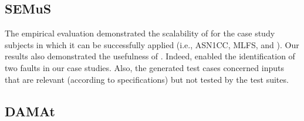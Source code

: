 \subsection{SEMuS}

%

The empirical evaluation demonstrated the scalability of \SEMUS for the case study subjects in which it can be successfully applied (i.e., ASN1CC, MLFS, and \UTIL). 
Our results also demonstrated the usefulness of \SEMUS. Indeed, \SEMUS enabled the identification of two faults in our case studies. Also, the generated test cases concerned inputs that are relevant (according to specifications) but not tested by the test suites.

%



\subsection{DAMAt}

